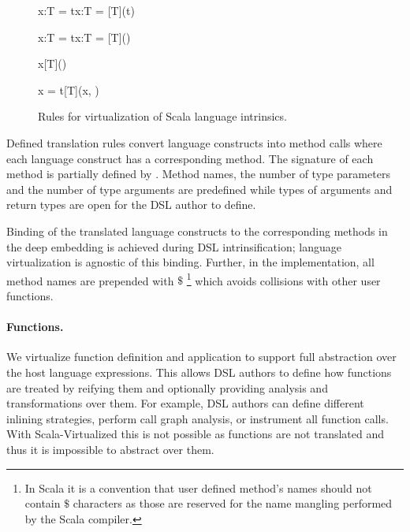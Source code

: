 \begin{figure}[!ht]
\begin{multicols}{2}
    \infyyax{}
      {\;x:T = t}{\;x:T = [T](t)}

    \infyyax{}
      {\;x:T = t}{\;x:T = [T]()}
\end{multicols}

\begin{multicols}{2}
    \infyy{}
      {}
      {x}{[T]()}

    \infyy{}
      {}
      {x = t}{[T](x, )}
\end{multicols}

\caption{Rules for virtualization of Scala language intrinsics.}
\label{fig:virt-core}
\end{figure}


 Defined translation rules convert language constructs into method calls where each language construct has
  a corresponding method. The signature of each method is partially defined by \yy. Method names, the number of
  type parameters and the number of type arguments are predefined while types of arguments and return types
  are open for the DSL author to define. 

 Binding of the translated language constructs to the corresponding methods
  in the deep embedding is achieved during DSL intrinsification; language virtualization is
  agnostic of this binding. Further, in the implementation, all method names are prepended with $\$$
  \footnote{In Scala it is a convention that user defined method's names should not contain $\$$ characters as those are reserved for the name mangling performed by the Scala compiler.} which avoids collisions with other user functions.

 \paragraph{Functions.} We virtualize function definition and application to support full abstraction over the host
  language expressions. This allows DSL authors to define how functions are treated by
  reifying them and optionally providing analysis and transformations over them. For example, DSL authors
  can define different inlining strategies, perform call graph analysis, or instrument all function calls. With Scala-Virtualized
  this is not possible as functions are not translated and thus it is impossible to
  abstract over them.

